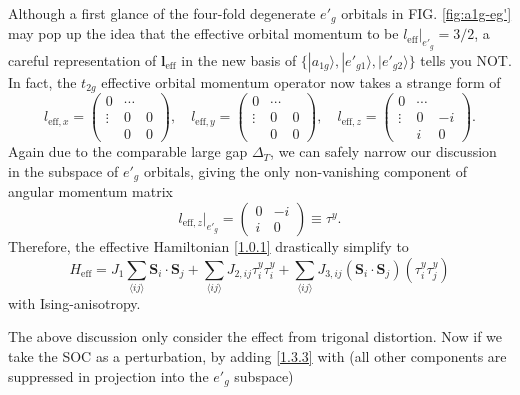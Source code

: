 \documentclass[10pt,nofootinbib,letterpaper]{revtex4}
\begin{document}
		Although a first glance of the four-fold degenerate $e'_g$ orbitals in FIG. \ref{fig:a1g-eg'} may pop up the idea that the effective orbital momentum to be $l_{\text{eff}}|_{e'_g}=3/2$, a careful representation of $\bm{l}_{\text{eff}}$ in the new basis of $\{|a_{1g}\rangle,|e'_{g1}\rangle,|e'_{g2}\rangle\}$ tells you NOT. In fact, the $t_{2g}$ effective orbital momentum operator now takes a strange form of
		\begin{equation}\label{1.3.1}
			l_{\text{eff},x}=\left(\begin{array}{c|cc}
				0 & \cdots &\\
				\hline
				\vdots & 0 & 0\\
				 & 0& 0
			\end{array}\right),\quad
			l_{\text{eff},y}=\left(\begin{array}{c|cc}
				0 & \cdots &\\
				\hline
				\vdots & 0 & 0\\
				 & 0& 0
			\end{array}\right),\quad
			l_{\text{eff},z}=\left(\begin{array}{c|cc}
				0 & \cdots &\\
				\hline
				\vdots & 0 & -i\\
				 & i & 0
			\end{array}\right).
		\end{equation}
		Again due to the comparable large gap $\Delta_T$, we can safely narrow our discussion in the subspace of $e'_g$ orbitals, giving the only non-vanishing component of angular momentum matrix
		\begin{equation}\label{1.3.2}
			l_{\text{eff},z}|_{e'_g}=\left(\begin{array}{cc}
				0 &-i\\i & 0
			\end{array}\right)\equiv\tau^y.
		\end{equation}
		Therefore, the effective Hamiltonian \eqref{1.0.1} drastically simplify to
		\begin{equation}\label{1.3.3}
			H_{\text{eff}}=J_1\sum_{\langle ij \rangle}\bm{S}_i\cdot\bm{S}_j+\sum_{\langle ij \rangle}J_{2,ij}\tau_i^y\tau_i^y+\sum_{\langle ij \rangle }J_{3,ij}(\bm{S}_i\cdot\bm{S}_j)(\tau_i^y\tau_j^y)
		\end{equation}
		with Ising-anisotropy.\par
		The above discussion only consider the effect from trigonal distortion. Now if we take the SOC as a perturbation, by adding \eqref{1.3.3} with (all other components are suppressed in projection into the $e'_g$ subspace)
\end{document}
